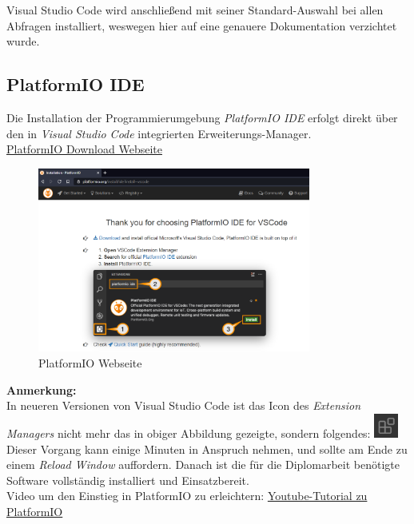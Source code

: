 Visual Studio Code wird anschließend mit seiner Standard-Auswahl bei allen Abfragen installiert, weswegen hier auf eine genauere Dokumentation verzichtet wurde.

\newpage
\subsection{PlatformIO IDE}
Die Installation der Programmierumgebung \textit{PlatformIO IDE} erfolgt direkt über den in \textit{Visual Studio Code} integrierten Erweiterungs-Manager.\\
\href{https://platformio.org/install/ide?install=vscode}{PlatformIO Download Webseite}
\begin{figure}[h]
	\centering
	\includegraphics[width=0.8\textwidth]{bilder/Webseite_PlatformIO.png}
	\caption{PlatformIO Webseite}
\end{figure}

\textbf{Anmerkung:}\\
In neueren Versionen von Visual Studio Code ist das Icon des \textit{Extension Managers} nicht mehr das in obiger Abbildung gezeigte, sondern folgendes:
\includegraphics[align=t,width=0.8cm]{bilder/Icon_Extension_Manager.png}\\

Dieser Vorgang kann einige Minuten in Anspruch nehmen, und sollte am Ende zu einem \textit{Reload Window} auffordern. Danach ist die für die Diplomarbeit benötigte Software vollständig installiert und Einsatzbereit.\\

Video um den Einstieg in PlatformIO zu erleichtern: \href{https://youtu.be/JmvMvIphMnY?t=715}{Youtube-Tutorial zu PlatformIO}\\

\newpage